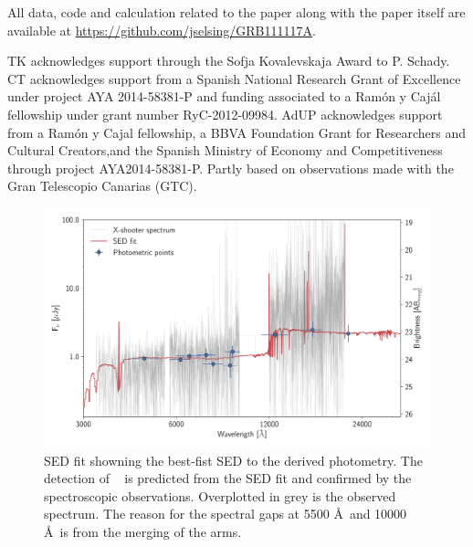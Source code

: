 \documentclass{aa}    %
\begin{document}
All data, code and calculation related to the paper along with the
paper itself are available at \url{https://github.com/jselsing/GRB111117A}.

\begin{acknowledgements}
TK acknowledges support through the Sofja Kovalevskaja Award to P. Schady. 
CT acknowledges support from a Spanish National Research Grant of Excellence under project AYA 2014-58381-P and funding associated to a Ramón y Cajál fellowship under grant number RyC-2012-09984.
AdUP acknowledges support from a Ramón y Cajal fellowship, a BBVA Foundation Grant for Researchers and Cultural Creators,and the Spanish Ministry of Economy and Competitiveness through project AYA2014-58381-P.
Partly based on observations made with the Gran Telescopio Canarias (GTC).


\end{acknowledgements}




\newpage





 \begin{figure}
 	\centering
 	\includegraphics[width=16cm]{figures/SEDspecphot.pdf}
 	\caption{SED fit showning the best-fist SED to the derived photometry. The detection of \lya~ is predicted from the SED fit and confirmed by the spectroscopic observations. Overplotted in grey is the observed spectrum. The reason for the spectral gaps at 5500 \AA~and 10000 \AA~is from the merging of the arms.}
 	\label{fig:SED}
 \end{figure}
\end{document}
